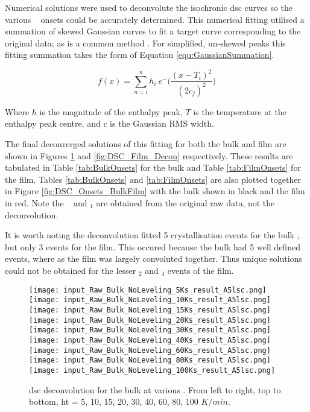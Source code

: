 \documentclass[draft,a4paper,12pt,oneside]{article}%
\begin{document}
Numerical 
solutions were used to deconvolute the isochronic \acrshort{dsc} curves so the various \Tx~ onsets could be accurately determined. This numerical fitting utilised a summation of skewed Gaussian curves to fit a target curve corresponding to the original data; as is a common method \cite{Ashour2010, Yamamoto2007, Spink2008, Spink2015, Schaffer2005}. For simplified, un-skewed peaks this fitting summation takes the form of Equation \ref{equ:GaussianSummation}.

\begin{equation}
	f(x) = \sum_{n=i}^{n} h_{i}~ e^-{\bigg(\frac{(x-T_{i})^2}{(2c_{j})^2}\bigg)}
	\label{equ:GaussianSummation}
\end{equation}

Where $h$ is the magnitude of the enthalpy peak, $T$ is the temperature at the enthalpy peak centre, and $c$ is the Gaussian RMS width.

The final deconverged solutions of this fitting for both the bulk and film are shown in Figures \ref{fig:DSC_Bulk_Decon} and \ref{fig:DSC_Film_Decon} respectively. These results are tabulated in Table \ref{tab:BulkOnsets} for the bulk and Table \ref{tab:FilmOnsets} for the film. Tables \ref{tab:BulkOnsets} and \ref{tab:FilmOnsets} are also plotted together in Figure \ref{fig:DSC_Onsets_BulkFilm} with the bulk shown in black and the film in red. Note the \Tg~ and \Tx$_{1}$ are obtained from the original raw data, not the deconvolution.

It is worth noting the deconvolution fitted 5 crystallisation events for the bulk \MgZnCa, but only 3 events for the film. This occured because the bulk had 5 well defined events, where as the film was largely convoluted together. Thus unique solutions could not be obtained for the lesser \Tx$_{2}$ and \Tx$_{4}$ events of the film. 

\begin{figure}[b]
	\centering
	\texttt{[image: input\_Raw\_Bulk\_NoLeveling\_5Ks\_result\_A5lsc.png]}\quad
	\texttt{[image: input\_Raw\_Bulk\_NoLeveling\_10Ks\_result\_A5lsc.png]}\quad
	\texttt{[image: input\_Raw\_Bulk\_NoLeveling\_15Ks\_result\_A5lsc.png]}
	\medskip
	\texttt{[image: input\_Raw\_Bulk\_NoLeveling\_20Ks\_result\_A5lsc.png]}\quad
	\texttt{[image: input\_Raw\_Bulk\_NoLeveling\_30Ks\_result\_A5lsc.png]}\quad
	\texttt{[image: input\_Raw\_Bulk\_NoLeveling\_40Ks\_result\_A5lsc.png]}
	\medskip
	\texttt{[image: input\_Raw\_Bulk\_NoLeveling\_60Ks\_result\_A5lsc.png]}\quad
	\texttt{[image: input\_Raw\_Bulk\_NoLeveling\_80Ks\_result\_A5lsc.png]}\quad
	\texttt{[image: input\_Raw\_Bulk\_NoLeveling\_100Ks\_result\_A5lsc.png]}
	\caption{\acrshort{dsc} deconvolution for the bulk at various . From left to right, top to bottom, \gls{ht} = 5, 10, 15, 20, 30, 40, 60, 80, 100 $K/min$.}
	\label{fig:DSC_Bulk_Decon}
\end{figure}
\end{document}

